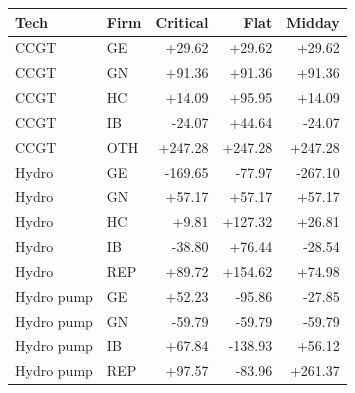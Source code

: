 \begin{tabular}{l l r r r}
\toprule
Tech & Firm & Critical & Flat & Midday \\
\midrule
CCGT & GE & +29.62 & +29.62 & +29.62 \\
CCGT & GN & +91.36 & +91.36 & +91.36 \\
CCGT & HC & +14.09 & +95.95 & +14.09 \\
CCGT & IB & -24.07 & +44.64 & -24.07 \\
CCGT & OTH & +247.28 & +247.28 & +247.28 \\
Hydro & GE & -169.65 & -77.97 & -267.10 \\
Hydro & GN & +57.17 & +57.17 & +57.17 \\
Hydro & HC & +9.81 & +127.32 & +26.81 \\
Hydro & IB & -38.80 & +76.44 & -28.54 \\
Hydro & REP & +89.72 & +154.62 & +74.98 \\
Hydro pump & GE & +52.23 & -95.86 & -27.85 \\
Hydro pump & GN & -59.79 & -59.79 & -59.79 \\
Hydro pump & IB & +67.84 & -138.93 & +56.12 \\
Hydro pump & REP & +97.57 & -83.96 & +261.37 \\
\bottomrule
\end{tabular}